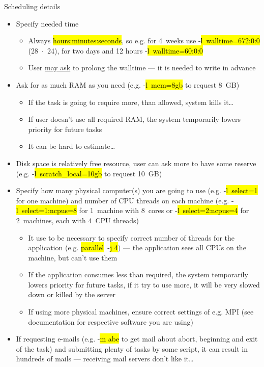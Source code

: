 \documentclass[compress, ucs, xelatex, 11pt, xcolor=svgnames, aspectratio=169,
	hyperref={
		bookmarks=true,
		unicode=true,
		colorlinks=true,
		pdftitle={Linux, command line and MetaCentrum},
		plainpages=false,
		pdfauthor={Vojtech Zeisek},
		pdfsubject={Course about use of Linux command line, writing shell scripts and using MetaCentrum of CESNET},
		pdfcreator={XeLaTeX},
		pdfkeywords={Linux, GNU, BASH, shell, command line, MetaCentrum},
		linkcolor=DarkRed, %
		anchorcolor=DarkBlue, %
		citecolor=Indigo, %
		filecolor=NavyBlue, %
		menucolor=DarkMagenta, %
		urlcolor=DarkBlue, %
		pdftex},
	url={hyphens, lowtilde} %
	]{beamer}
\renewcommand{\texttt}[1]{\hl{\ttfamily #1}}
\begin{document}
\begin{frame}[allowframebreaks]{Scheduling details}
	\begin{itemize}
		\item Specify needed time
		\begin{itemize}
			\item Always \texttt{hours:minutes:seconds}, so e.g. for 4~weeks use -\texttt{l~walltime=672:0:0} (28~$\cdot$~24), for two days and 12 hours -\texttt{l~walltime=60:0:0}
			\item User \href{mailto:meta@cesnet.cz}{may ask} to prolong the walltime --- it is needed to write in advance
		\end{itemize}
		\item Ask for as much RAM as you need (e.g. -\texttt{l~mem=8gb} to request 8~GB)
		\begin{itemize}
			\item If the task is going to require more, than allowed, system kills it\ldots
			\item If user doesn't use all required RAM, the system temporarily lowers priority for future tasks
			\item It can be hard to estimate\ldots
		\end{itemize}
		\item Disk space is relatively free resource, user can ask more to have some reserve (e.g. -\texttt{l~scratch\_local=10gb} to request 10~GB)
		\item Specify how many physical computer(s) you are going to use (e.g. -\texttt{l~select=1} for one machine) and number of CPU threads on each machine (e.g. -\texttt{l~select=1:ncpus=8} for 1~machine with 8~cores or -\texttt{l~select=2:ncpus=4} for 2~machines, each with 4~CPU threads)
		\begin{itemize}
			\item It use to be necessary to specify correct number of threads for the application (e.g. \texttt{parallel}~-\texttt{j 4}) --- the application sees all CPUs on the machine, but can't use them
			\item If the application consumes less than required, the system temporarily lowers priority for future tasks, if it try to use more, it will be very slowed down or killed by the server
			\item If using more physical machines, ensure correct settings of e.g. MPI (see documentation for respective software you are using)
		\end{itemize}
		\item If requesting e-mails (e.g. -\texttt{m abe} to get mail about abort, beginning and exit of the task) and submitting plenty of tasks by some script, it can result in hundreds of mails --- receiving mail servers don't like it\ldots

\end{itemize}
\end{frame}
\end{document}
